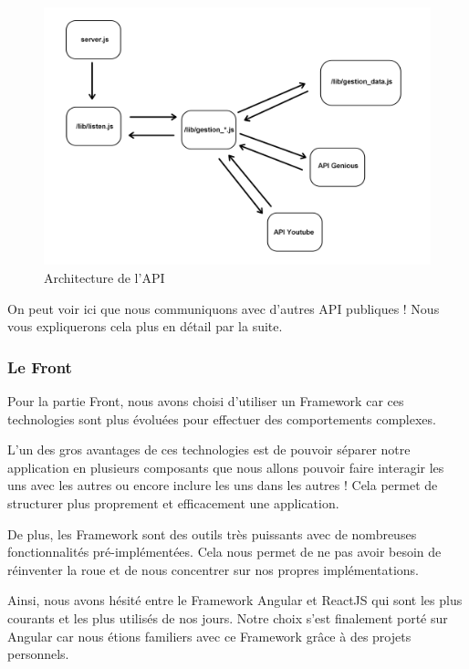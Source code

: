 \documentclass[12pt,french]{article}
\begin{document}
\begin{figure}[H]
	\centering
	\includegraphics[scale=0.16]{api.png}
	\caption{Architecture de l'API}
\end{figure}

\medskip

On peut voir ici que nous communiquons avec d'autres API publiques ! Nous vous expliquerons cela plus en détail par la suite.

\subsubsection{Le Front}

Pour la partie Front, nous avons choisi d'utiliser un Framework car ces technologies sont plus évoluées pour effectuer des comportements complexes.

\medskip

L'un des gros avantages de ces technologies est de pouvoir séparer notre application en plusieurs composants que nous allons pouvoir faire interagir les uns avec les autres ou encore inclure les uns dans les autres ! Cela permet de structurer plus proprement et efficacement une application.

\medskip

De plus, les Framework sont des outils très puissants avec de nombreuses fonctionnalités pré-implémentées. Cela nous permet de ne pas avoir besoin de réinventer la roue et de nous concentrer sur nos propres implémentations.

\medskip

Ainsi, nous avons hésité entre le Framework Angular et ReactJS qui sont les plus courants et les plus utilisés de nos jours. Notre choix s'est finalement porté sur Angular car nous étions familiers avec ce Framework grâce à des projets personnels. 
\end{document}
